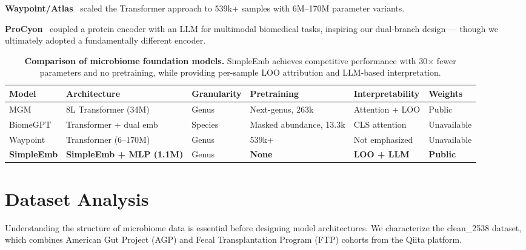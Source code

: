 \documentclass[11pt,a4paper]{article}
\begin{document}
\textbf{Waypoint/Atlas}~\cite{waypoint2026} scaled the Transformer approach to 539k+ samples with 6M--170M parameter variants.

\textbf{ProCyon}~\cite{procyon2025} coupled a protein encoder with an LLM for multimodal biomedical tasks, inspiring our dual-branch design --- though we ultimately adopted a fundamentally different encoder.

\begin{table}[ht]
\centering
\caption{\textbf{Comparison of microbiome foundation models.}
SimpleEmb achieves competitive performance with 30$\times$ fewer parameters and no pretraining,
while providing per-sample LOO attribution and LLM-based interpretation.}
\label{tab:fm_comparison}
\begin{tabular}{p{2.4cm}p{2.6cm}p{2.0cm}p{2.4cm}p{2.4cm}p{2.2cm}}
\toprule
\textbf{\hspace{0pt}Model} & \textbf{\hspace{0pt}Architecture} & \textbf{\hspace{0pt}Granularity} & \textbf{\hspace{0pt}Pretraining} & \textbf{\hspace{0pt}Interpretability} & \textbf{\hspace{0pt}Weights} \\
\midrule
MGM~\cite{mgm2024} & 8L Transformer (34M) & Genus & Next-genus, 263k & Attention + LOO & Public \\
BiomeGPT~\cite{biomegpt2026} & Transformer + dual emb & Species & Masked abundance, 13.3k & CLS attention & Unavailable \\
Waypoint~\cite{waypoint2026} & Transformer (6--170M) & Genus & 539k+ & Not emphasized & Unavailable \\
\textbf{SimpleEmb} & \textbf{SimpleEmb + MLP (1.1M)} & Genus & \textbf{None} & \textbf{LOO + LLM} & \textbf{Public} \\
\bottomrule
\end{tabular}
\end{table}

\section{Dataset Analysis}

Understanding the structure of microbiome data is essential before designing model architectures. We characterize the clean\_2538 dataset, which combines American Gut Project (AGP) and Fecal Transplantation Program (FTP) cohorts from the Qiita platform.
\end{document}
